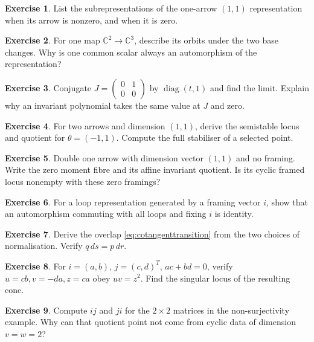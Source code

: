 \documentclass[11pt,a4paper]{article}
\numberwithin{equation}{section}
\theoremstyle{definition}
\newtheorem{exercise}{Exercise}
\begin{document}
\begin{exercise}\label{ex:subrep}
List the subrepresentations of the one-arrow $(1,1)$
representation when its arrow is nonzero, and when it is zero.
\end{exercise}
\begin{exercise}\label{ex:rank}
For one map $\mathbb C^2\to\mathbb C^3$, describe its orbits
under the two base changes. Why is one common scalar always
an automorphism of the representation?
\end{exercise}
\begin{exercise}\label{ex:degeneration}
Conjugate $J=\left(\begin{smallmatrix}0&1\\0&0\end{smallmatrix}\right)$
by $\operatorname{diag}(t,1)$ and find the limit. Explain why
an invariant polynomial takes the same value at $J$ and zero.
\end{exercise}
\begin{exercise}\label{ex:kronecker}
For two arrows and dimension $(1,1)$, derive the semistable
locus and quotient for $\theta=(-1,1)$. Compute the full
stabiliser of a selected point.
\end{exercise}
\begin{exercise}\label{ex:unionaxes}
Double one arrow with dimension vector $(1,1)$ and no framing.
Write the zero moment fibre and its affine invariant quotient.
Is its cyclic framed locus nonempty with these zero framings?
\end{exercise}
\begin{exercise}\label{ex:free}
For a loop representation generated by a framing vector $i$,
show that an automorphism commuting with all loops and fixing
$i$ is identity.
\end{exercise}
\begin{exercise}\label{ex:grasschart}
Derive the overlap \eqref{eq:cotangenttransition} from the
two choices of normalisation. Verify $q\,ds=p\,dr$.
\end{exercise}
\begin{exercise}\label{ex:cone}
For $i=(a,b)$, $j=(c,d)^T$, $ac+bd=0$, verify
$u=cb,v=-da,z=ca$ obey $uv=z^2$. Find the singular locus
of the resulting cone.
\end{exercise}
\begin{exercise}\label{ex:nonsurj}
Compute $ij$ and $ji$ for the $2\times2$ matrices in the
non-surjectivity example. Why can that quotient point not
come from cyclic data of dimension $v=w=2$?
\end{exercise}
\end{document}
